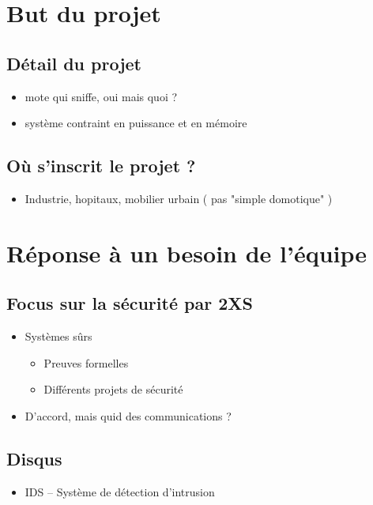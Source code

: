 \section{But du projet}

	\subsection{Détail du projet}
		\begin{itemize}
			\item mote qui sniffe, oui mais quoi ?
			\item système contraint en puissance et en mémoire
		\end{itemize}
	\subsection{Où s'inscrit le projet ?}
		\begin{itemize}
			\item Industrie, hopitaux, mobilier urbain ( pas "simple domotique" )
		\end{itemize}

\section{Réponse à un besoin de l'équipe}
	
	\subsection{Focus sur la sécurité par 2XS}
	\begin{itemize}
		\item Systèmes sûrs
		\begin{itemize}
			\item Preuves formelles
			\item Différents projets de sécurité
		\end{itemize}
		\item D'accord, mais quid des communications ?
	\end{itemize}
	
	\subsection{Disqus}
	\begin{itemize}
		\item IDS -- Système de détection d'intrusion
	\end{itemize}

